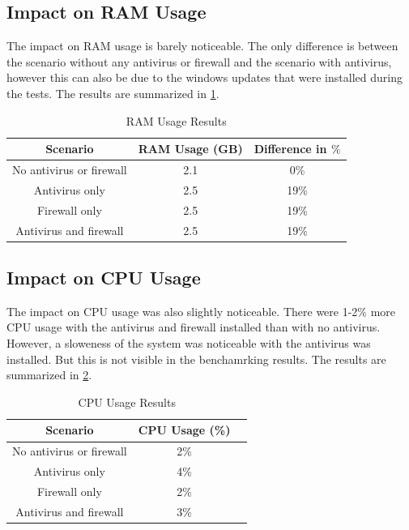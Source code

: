 \documentclass[runningheads,a4paper,english]{llncs}[2022/01/12]
\begin{document}
\subsection{Impact on RAM Usage}
\label{sec:ram}

\par The impact on RAM usage is barely noticeable. The only difference is
between the scenario without any antivirus or firewall and the scenario with
antivirus, however this can also be due to the windows updates that were
installed during the tests. The results are summarized in \cref{tab:ram}.

\begin{table}[h]
\centering
  \begin{tabular}{|c|c|c|}
    \hline
    Scenario & RAM Usage (GB) & Difference in $\%$ \\
    \hline
    No antivirus or firewall & 2.1 & 0\% \\
    Antivirus only & 2.5 & 19\% \\
    Firewall only & 2.5 & 19\% \\
    Antivirus and firewall & 2.5 & 19\% \\
    \hline
  \end{tabular}
  \caption{RAM Usage Results}
  \label{tab:ram}
\end{table}

\subsection{Impact on CPU Usage}
\label{sec:cpu}

\par The impact on CPU usage was also slightly noticeable. There were 1-2\%
more CPU usage with the antivirus and firewall installed than with no
antivirus. However, a sloweness of the system was noticeable with the antivirus
was installed. But this is not visible in the benchamrking results. The results
are summarized in \cref{tab:cpu}.

\begin{table}[h]
\centering
  \begin{tabular}{|c|c|c|}
    \hline
    Scenario & CPU Usage (\%) \\
    \hline
    No antivirus or firewall & 2\% \\
    Antivirus only & 4\% \\
    Firewall only & 2\% \\
    Antivirus and firewall & 3\% \\
    \hline
  \end{tabular}
  \caption{CPU Usage Results}
  \label{tab:cpu}
\end{table}
\end{document}

